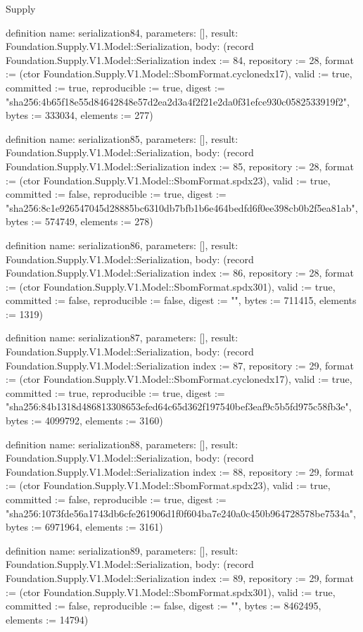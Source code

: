 \begin{lexlean}{Supply}
\begin{semanticmodule}
definition{
  name: serialization84,
  parameters: [],
  result: Foundation.Supply.V1.Model::Serialization,
  body: (record Foundation.Supply.V1.Model::Serialization {index := 84, repository := 28, format := (ctor Foundation.Supply.V1.Model::SbomFormat.cyclonedx17), valid := true, committed := true, reproducible := true, digest := "sha256:4b65f18e55d84642848e57d2ea2d3a4f2f21e2da0f31efce930c0582533919f2", bytes := 333034, elements := 277})
}

definition{
  name: serialization85,
  parameters: [],
  result: Foundation.Supply.V1.Model::Serialization,
  body: (record Foundation.Supply.V1.Model::Serialization {index := 85, repository := 28, format := (ctor Foundation.Supply.V1.Model::SbomFormat.spdx23), valid := true, committed := false, reproducible := true, digest := "sha256:8c1e926547045d28885bc6310db7bfb1b6e464bedfd6f0ee398cb0b2f5ea81ab", bytes := 574749, elements := 278})
}

definition{
  name: serialization86,
  parameters: [],
  result: Foundation.Supply.V1.Model::Serialization,
  body: (record Foundation.Supply.V1.Model::Serialization {index := 86, repository := 28, format := (ctor Foundation.Supply.V1.Model::SbomFormat.spdx301), valid := true, committed := false, reproducible := false, digest := "", bytes := 711415, elements := 1319})
}

definition{
  name: serialization87,
  parameters: [],
  result: Foundation.Supply.V1.Model::Serialization,
  body: (record Foundation.Supply.V1.Model::Serialization {index := 87, repository := 29, format := (ctor Foundation.Supply.V1.Model::SbomFormat.cyclonedx17), valid := true, committed := true, reproducible := true, digest := "sha256:84b1318d486813308653efed64c65d362f197540bef3eaf9c5b5fd975c58fb3e", bytes := 4099792, elements := 3160})
}

definition{
  name: serialization88,
  parameters: [],
  result: Foundation.Supply.V1.Model::Serialization,
  body: (record Foundation.Supply.V1.Model::Serialization {index := 88, repository := 29, format := (ctor Foundation.Supply.V1.Model::SbomFormat.spdx23), valid := true, committed := false, reproducible := true, digest := "sha256:1073fde56a1743db6cfe261906d1f0f604ba7e240a0c450b964728578be7534a", bytes := 6971964, elements := 3161})
}

definition{
  name: serialization89,
  parameters: [],
  result: Foundation.Supply.V1.Model::Serialization,
  body: (record Foundation.Supply.V1.Model::Serialization {index := 89, repository := 29, format := (ctor Foundation.Supply.V1.Model::SbomFormat.spdx301), valid := true, committed := false, reproducible := false, digest := "", bytes := 8462495, elements := 14794})
}


\end{semanticmodule}
\end{lexlean}
